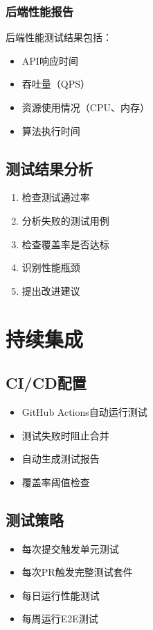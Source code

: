 \documentclass[12pt,a4paper,openany]{report}
\begin{document}
\subsubsection{后端性能报告}

后端性能测试结果包括：

\begin{itemize}
    \item API响应时间
    \item 吞吐量（QPS）
    \item 资源使用情况（CPU、内存）
    \item 算法执行时间
\end{itemize}

\subsection{测试结果分析}

\begin{enumerate}
    \item 检查测试通过率
    \item 分析失败的测试用例
    \item 检查覆盖率是否达标
    \item 识别性能瓶颈
    \item 提出改进建议
\end{enumerate}

\section{持续集成}

\subsection{CI/CD配置}

\begin{itemize}
    \item GitHub Actions自动运行测试
    \item 测试失败时阻止合并
    \item 自动生成测试报告
    \item 覆盖率阈值检查
\end{itemize}

\subsection{测试策略}

\begin{itemize}
    \item 每次提交触发单元测试
    \item 每次PR触发完整测试套件
    \item 每日运行性能测试
    \item 每周运行E2E测试
\end{itemize}
\end{document}
